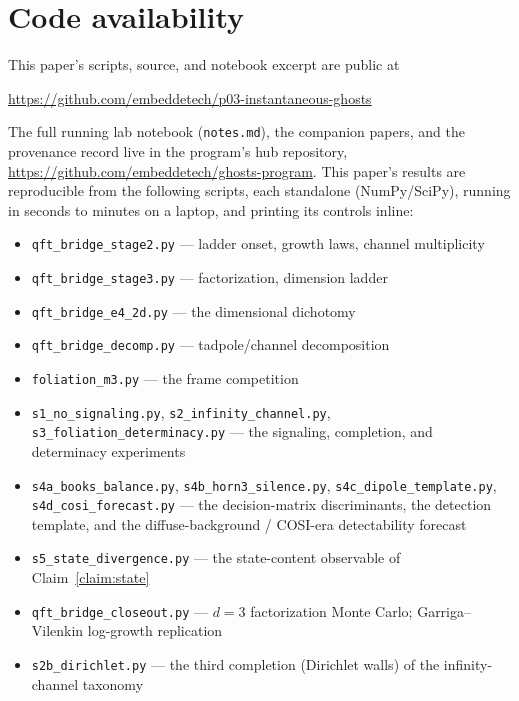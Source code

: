 \documentclass[11pt]{article}
\theoremstyle{definition}
\theoremstyle{remark}
\begin{document}
\section*{Code availability}
\label{sec:code}

This paper's scripts, source, and notebook excerpt are public at
\begin{center}
  \url{https://github.com/embeddetech/p03-instantaneous-ghosts}
\end{center}
The full running lab notebook (\texttt{notes.md}), the companion
papers, and the provenance record live in the program's hub
repository,
\url{https://github.com/embeddetech/ghosts-program}.
This paper's results are reproducible from the following scripts,
each standalone (NumPy/SciPy), running in seconds to minutes on a
laptop, and printing its controls inline:
\begin{itemize}\setlength\itemsep{1pt}\raggedright
\item \texttt{qft\_bridge\_stage2.py} --- ladder onset, growth laws,
  channel multiplicity
\item \texttt{qft\_bridge\_stage3.py} --- factorization, dimension
  ladder
\item \texttt{qft\_bridge\_e4\_2d.py} --- the dimensional dichotomy
\item \texttt{qft\_bridge\_decomp.py} --- tadpole/channel
  decomposition
\item \texttt{foliation\_m3.py} --- the frame competition
\item \texttt{s1\_no\_signaling.py},
  \texttt{s2\_infinity\_channel.py},
  \texttt{s3\_foliation\_determinacy.py} --- the signaling,
  completion, and determinacy experiments
\item \texttt{s4a\_books\_balance.py},
  \texttt{s4b\_horn3\_silence.py},
  \texttt{s4c\_dipole\_template.py},
  \texttt{s4d\_cosi\_forecast.py} --- the decision-matrix
  discriminants, the detection template, and the diffuse-background /
  COSI-era detectability forecast
\item \texttt{s5\_state\_divergence.py} --- the state-content
  observable of Claim~\ref{claim:state}
\item \texttt{qft\_bridge\_closeout.py} --- $d=3$ factorization
  Monte Carlo; Garriga--Vilenkin log-growth replication
\item \texttt{s2b\_dirichlet.py} --- the third completion
  (Dirichlet walls) of the infinity-channel taxonomy
\end{itemize}
\end{document}
